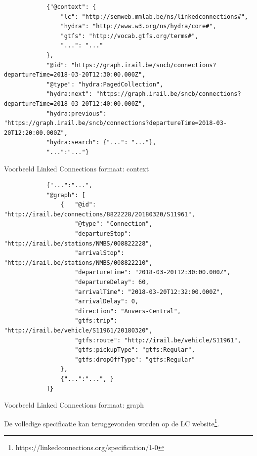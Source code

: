\begin{listing}[h]
	\begin{verbatim}
			{"@context": {
			    "lc": "http://semweb.mmlab.be/ns/linkedconnections#",
			    "hydra": "http://www.w3.org/ns/hydra/core#",
			    "gtfs": "http://vocab.gtfs.org/terms#",
			    "...": "..."
			},
			"@id": "https://graph.irail.be/sncb/connections?departureTime=2018-03-20T12:30:00.000Z",
			"@type": "hydra:PagedCollection",
			"hydra:next": "https://graph.irail.be/sncb/connections?departureTime=2018-03-20T12:40:00.000Z",
			"hydra:previous": "https://graph.irail.be/sncb/connections?departureTime=2018-03-20T12:20:00.000Z",
			"hydra:search": {"...": "..."},
			"...":"..."}
		\end{verbatim}
	\caption{Voorbeeld Linked Connections formaat: context}
	\label{code:2:linkedconnections-response-context}
\end{listing}
\begin{listing}[h]
	\begin{verbatim}
			{"...":"...",
			"@graph": [
				{   "@id": "http://irail.be/connections/8822228/20180320/S11961",
				    "@type": "Connection",
    				"departureStop": "http://irail.be/stations/NMBS/008822228",
    				"arrivalStop": "http://irail.be/stations/NMBS/008822210",
    				"departureTime": "2018-03-20T12:30:00.000Z",
    				"departureDelay": 60,
    				"arrivalTime": "2018-03-20T12:32:00.000Z",
    				"arrivalDelay": 0,
    				"direction": "Anvers-Central",
    				"gtfs:trip": "http://irail.be/vehicle/S11961/20180320",
    				"gtfs:route": "http://irail.be/vehicle/S11961",
    				"gtfs:pickupType": "gtfs:Regular",
    				"gtfs:dropOffType": "gtfs:Regular"
				},
				{"...":"...", }
			]}
	\end{verbatim}
\caption{Voorbeeld Linked Connections formaat: graph}
\label{code:2:linkedconnections-response-graph}
\end{listing}
 
De volledige specificatie kan teruggevonden worden op de LC website\footnote{https://linkedconnections.org/specification/1-0}.
 
